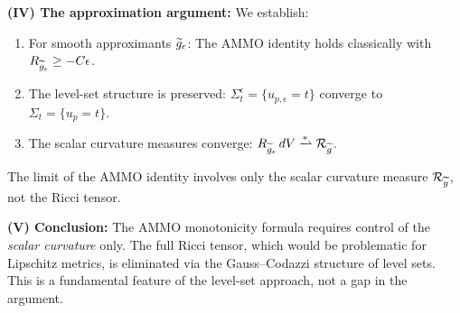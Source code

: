 \begin{remark}
\textbf{(IV) The approximation argument:} We establish:
\begin{enumerate}
    \item For smooth approximants $\widetilde{g}_\epsilon$: The AMMO identity holds classically with $R_{\widetilde{g}_\epsilon} \ge -C\epsilon$.
    \item The level-set structure is preserved: $\Sigma_t^\epsilon = \{u_{p,\epsilon} = t\}$ converge to $\Sigma_t = \{u_p = t\}$.
    \item The scalar curvature measures converge: $R_{\tg_\epsilon} \, dV \xrightharpoonup{*} \mathcal{R}_{\tg}$.
\end{enumerate}
The limit of the AMMO identity involves only the scalar curvature measure $\mathcal{R}_{\widetilde{g}}$, not the Ricci tensor.

\textbf{(V) Conclusion:} The AMMO monotonicity formula requires control of the \emph{scalar curvature} only. The full Ricci tensor, which would be problematic for Lipschitz metrics, is eliminated via the Gauss--Codazzi structure of level sets. This is a fundamental feature of the level-set approach, not a gap in the argument.
\end{remark}

